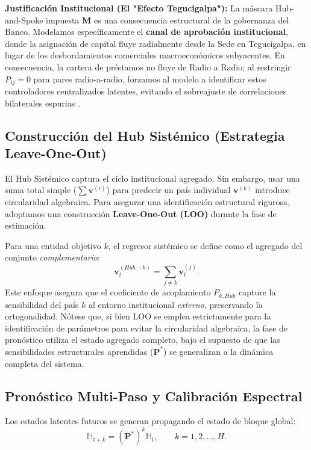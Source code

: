 \documentclass[11pt, letterpaper]{report}
\newcommand{\mat}[1]{\mathbf{#1}}
\newcommand{\vect}[1]{\mathbf{#1}}
\newcommand{\supermat}[1]{\mathbb{#1}}
\begin{document}
\textbf{Justificación Institucional (El "Efecto Tegucigalpa"):} La máscara Hub-and-Spoke impuesta $\mat{M}$ es una consecuencia estructural de la gobernanza del Banco. Modelamos específicamente el \textbf{canal de aprobación institucional}, donde la asignación de capital fluye radialmente desde la Sede en Tegucigalpa, en lugar de los desbordamientos comerciales macroeconómicos subyacentes. En consecuencia, la cartera de préstamos no fluye de Radio a Radio; al restringir $P_{ij}=0$ para pares radio-a-radio, forzamos al modelo a identificar estos controladores centralizados latentes, evitando el sobreajuste de correlaciones bilaterales espurias \cite{acemoglu2012network}.

\subsection{Construcción del Hub Sistémico (Estrategia Leave-One-Out)}

El Hub Sistémico captura el ciclo institucional agregado. Sin embargo, usar una suma total simple ($\sum \vect{v}^{(i)}$) para predecir un país individual $\vect{v}^{(k)}$ introduce circularidad algebraica. Para asegurar una identificación estructural rigurosa, adoptamos una construcción \textbf{Leave-One-Out (LOO)} durante la fase de estimación.

Para una entidad objetivo $k$, el regresor sistémico se define como el agregado del conjunto \textit{complementario}:
\begin{equation}
    \vect{v}_t^{(Hub, -k)} = \sum_{j \neq k} \vect{v}_t^{(j)}.
\end{equation}
Este enfoque asegura que el coeficiente de acoplamiento $P_{k, Hub}$ capture la sensibilidad del país $k$ al entorno institucional \textit{externo}, preservando la ortogonalidad. Nótese que, si bien LOO se emplea estrictamente para la identificación de parámetros para evitar la circularidad algebraica, la fase de pronóstico utiliza el estado agregado completo, bajo el supuesto de que las sensibilidades estructurales aprendidas ($\mat{P}^*$) se generalizan a la dinámica completa del sistema.

\subsection{Pronóstico Multi-Paso y Calibración Espectral}

Los estados latentes futuros se generan propagando el estado de bloque global:
\begin{equation}
    \supermat{H}_{t+k} = (\mat{P}^*)^{k} \supermat{H}_t,
    \qquad k = 1,2,\dots,H.
\end{equation}
\end{document}
